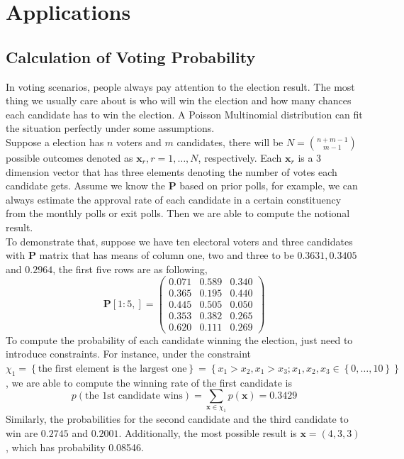 \documentclass[12pt]{article}
\newcommand{\Pmat}{\mathbf{P}}
\newcommand{\xvec}{\boldsymbol{x}}
\begin{document}
\section{Applications}
\subsection{Calculation of Voting Probability}

  In voting scenarios, people always pay attention to the election result. The most thing we usually care about is who will win the election and how many chances each candidate has to win the election. A Poisson Multinomial distribution can fit the situation perfectly under some assumptions.\\

Suppose a election has $n$ voters and $m$ candidates, there will be $N = \binom{n+m-1}{m-1}$ possible outcomes denoted as $\boldsymbol{x}_r, r = 1, \dots, N$, respectively. Each $\xvec_r$ is a 3 dimension vector that has three elements denoting the number of votes each candidate gets. Assume we know the $\Pmat$ based on prior polls, for example, we can always estimate the approval rate of each candidate in a certain constituency from the monthly polls or exit polls. Then we are able to compute the notional result.\\

To demonstrate that, suppose we have ten electoral voters and three candidates with $\Pmat$ matrix that has means of column one, two and three to be $0.3631,0.3405$ and $0.2964$, the first five rows are as following,
\begin{equation*}
    \Pmat[1:5,] = \begin{pmatrix}
0.071 & 0.589 & 0.340\\
0.365 & 0.195 & 0.440\\
0.445 & 0.505 & 0.050\\
0.353 & 0.382 & 0.265\\
0.620 & 0.111 & 0.269
    \end{pmatrix}
\end{equation*}
To compute the probability of each candidate winning the election, just need to introduce constraints. For instance, under the constraint $\chi_1 = \left\{\text{the first element is the largest one}\right\} = \left\{x_1>x_2, x_1>x_3; x_1, x_2,x_3 \in \left\{0,\dots,10\right\}\right\}$, we are able to compute the winning rate of the first candidate is
\begin{equation*}
    p(\text{the 1st candidate wins}) = \sum_{\boldsymbol{x} \in \chi_{1}} p(\boldsymbol{x}) = 0.3429
\end{equation*}
Similarly, the probabilities for the second candidate and the third candidate to win are $0.2745$ and $0.2001$. Additionally, the most possible result is $\boldsymbol{x} = (4,3,3)$, which has probability 0.08546.
\end{document}
